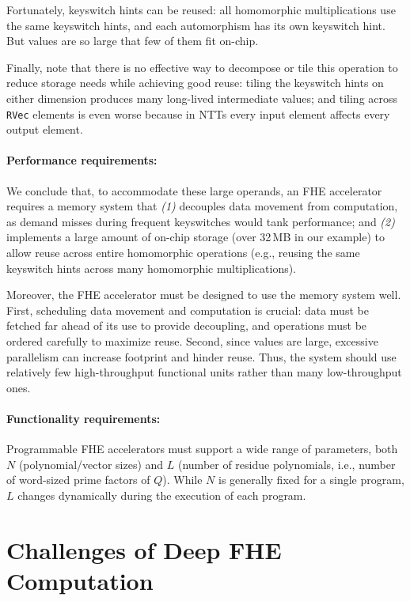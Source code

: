 Fortunately, keyswitch hints can be reused: all homomorphic multiplications use
the same keyswitch hints, and each automorphism has its own keyswitch hint. But
values are so large that few of them fit on-chip.

Finally, note that there is no effective way to decompose or tile this
operation to reduce storage needs while achieving good reuse: tiling the
keyswitch hints on either dimension produces many long-lived
intermediate values; and tiling across \texttt{RVec} elements is even worse
because in NTTs every input element affects every output element.

\paragraph{Performance requirements:} We conclude that, to accommodate these
large operands, an FHE accelerator requires a memory system that \emph{(1)}
decouples data movement from computation, as demand misses during frequent
keyswitches would tank performance; and \emph{(2)} implements a large amount of
on-chip storage (over 32\,MB in our example) to allow reuse across entire
homomorphic operations (e.g., reusing the same keyswitch hints across many
homomorphic multiplications).

Moreover, the FHE accelerator must be designed to use the memory system well.
First, scheduling data movement and computation is crucial: data must be
fetched far ahead of its use to provide decoupling, and operations must be
ordered carefully to maximize reuse. Second, since values are large, excessive
parallelism can increase footprint and hinder reuse. Thus, the system should
use relatively few high-throughput functional units rather than many
low-throughput ones.

\paragraph{Functionality requirements:}
Programmable FHE accelerators must support a wide range of parameters, both $N$
(polynomial/vector sizes) and $L$ (number of residue polynomials, i.e., number
of word-sized prime factors of $Q$). While $N$ is generally fixed for a single
program, $L$ changes dynamically during the execution of each program.

\section{Challenges of Deep FHE Computation}
\label{sec:deepChallenges}

